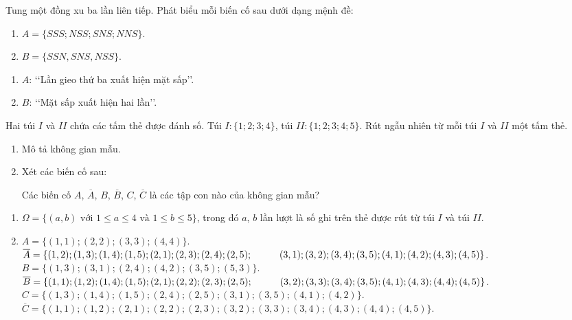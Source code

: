 \begin{bt}%
	Tung một đồng xu ba lần liên tiếp. Phát biểu mỗi biến cố sau dưới dạng mệnh đề:
	\begin{enumerate}
		\item $A=\{SSS; NSS; SNS; NNS\}$.
		\item $B=\{SSN, SNS, NSS\}$.
	\end{enumerate}
	\loigiai
	{
		\begin{enumerate}
			\item $A$: \lq\lq  Lần gieo thứ ba xuất hiện mặt sấp\rq\rq.
			\item $B$: \lq\lq  Mặt sấp xuất hiện hai lần\rq\rq.
		\end{enumerate}
	}
\end{bt}

\begin{bt}%
	Hai túi $I$ và $II$ chứa các tấm thẻ được đánh số. Túi $I \colon \{1; 2; 3; 4\}$, túi $II \colon \{1; 2; 3; 4; 5\}$. Rút ngẫu nhiên từ mỗi túi $I$ và $II$ một tấm thẻ.
	\begin{enumerate}
		\item Mô tả không gian mẫu.
		\item Xét các biến cố sau:
		Các biến cố $A$, $\overline{A}$, $B$, $\overline{B}$, $C$, $\overline{C}$ là các tập con nào của không gian mẫu?
	\end{enumerate}
	\loigiai
	{
		\begin{enumerate}
			\item $\Omega= \{(a,b) \text{ với } 1\le a\le 4 \text{ và } 1\le b\le 5\}$, trong đó $a$, $b$ lần lượt là số ghi trên thẻ được rút từ túi $I$ và túi $II$.
			\item $A=\{(1,1); (2,2); (3,3); (4,4)\}$.\\
			$\overline{A}= \{(1,2); (1,3); (1,4); (1,5); (2,1); (2,3); (2,4); (2,5);\\
			\hspace*{1cm} (3,1); (3,2); (3,4); (3,5); (4,1); (4,2); (4,3); (4,5)\}$.\\
			$B= \{(1,3); (3,1); (2,4); (4,2); (3,5); (5,3)\}$.\\
			$\overline{B}=\{(1,1); (1,2); (1,4); (1,5); (2,1); (2,2); (2,3); (2,5);\\
			\hspace*{1cm} (3,2); (3,3); (3,4); (3,5); (4,1); (4,3); (4,4); (4,5)\}$.\\
			$C=\{(1,3); (1,4); (1,5); (2,4); (2,5); (3,1); (3,5); (4,1); (4,2)\}$.\\
			$\overline{C}=\{(1,1); (1,2); (2,1); (2,2); (2,3); (3,2); (3,3); (3,4); (4,3); (4,4); (4,5)\}$.
		\end{enumerate}
	}
\end{bt}

